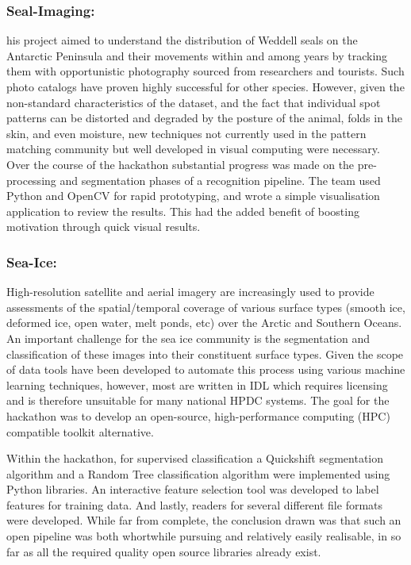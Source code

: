 \documentclass[conference]{IEEEtran}
\begin{document}
\subsubsection{Seal-Imaging:}his project aimed to understand the distribution of Weddell seals on the Antarctic Peninsula and their movements within and among years by tracking them with opportunistic photography sourced from researchers and tourists. Such photo catalogs have proven highly successful for other species.  However, given the non-standard characteristics of the dataset, and the fact that individual spot patterns can be distorted and degraded by the posture of the animal, folds in the skin, and even moisture, new techniques not currently used in the pattern matching community but well developed in visual computing were necessary.  Over the course of the hackathon substantial progress was made on the pre-processing and segmentation phases of a recognition pipeline.  The team used Python and OpenCV for rapid prototyping, and wrote a simple visualisation application to review the results.  This had the added benefit of boosting motivation through quick visual results.
\subsubsection{Sea-Ice:}
High-resolution satellite and aerial imagery are increasingly used to provide assessments of the spatial/temporal coverage of various surface types (smooth ice, deformed ice, open water, melt ponds, etc) over the Arctic and Southern Oceans. An important challenge for the sea ice community is the segmentation and classification of these images into their constituent surface types. Given the scope of data tools have been developed to automate this process using various machine learning techniques, however, most are written in IDL which requires licensing and is therefore unsuitable for many national HPDC systems. The goal for the hackathon was to develop an open-source, high-performance computing (HPC) compatible toolkit alternative.

Within the hackathon, for supervised classification a Quickshift segmentation algorithm and a Random Tree classification algorithm were implemented using Python libraries.  An interactive feature selection tool was developed to label features for training data.  And lastly, readers for several different file formats were developed.  While far from complete, the conclusion drawn was that such an open pipeline was both whortwhile pursuing and relatively easily realisable, in so far as all the required quality open source libraries already exist.
\end{document}
